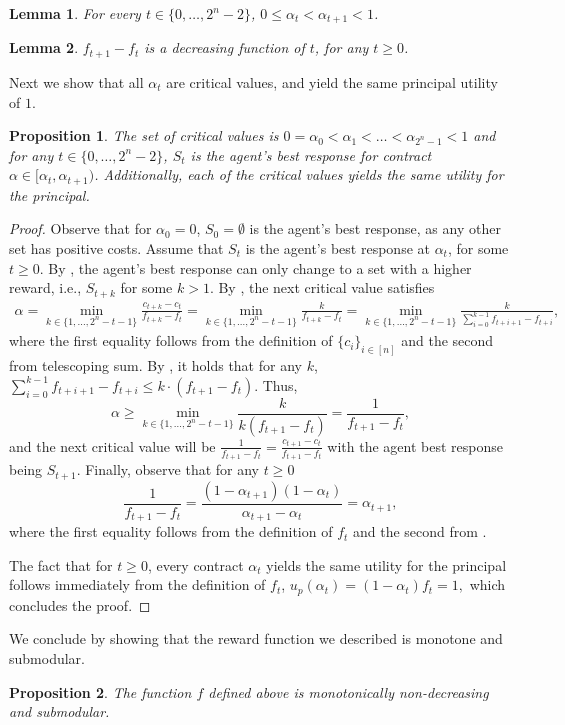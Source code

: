 \documentclass[11pt]{article}
\newtheorem{lemma}{Lemma}
\newtheorem{proposition}{Proposition}
\begin{document}
\begin{lemma}\label{lem:alphaMon}
    For every $t \in \{0,\dots,2^n-2\}$, $0 \le \alpha_t < \alpha_{t+1} < 1$.
\end{lemma}

\begin{lemma}\label{lem:fMarginalDecrease}
     $f_{t+1} - f_t$ is a decreasing function of $t$, for any $t \ge 0$.
\end{lemma}

Next we show that all $\alpha_t$ are critical values, and yield the same principal utility of $1$.
\begin{proposition}\label{prop:CVs}
    The set of critical values is $0 = \alpha_0 < \alpha_1 < \ldots < \alpha_{2^n-1} < 1$ and for any $t \in \{0, \ldots, 2^n-2\}$, $S_t$ is the agent's best response for contract $\alpha \in [\alpha_t, \alpha_{t+1})$. Additionally, each of the critical values yields the same utility for the principal.
\end{proposition}
\begin{proof}
    Observe that for $\alpha_0=0$, $S_0=\emptyset$ is the agent's best response, as any other set has positive costs.
    Assume that $S_t$ is the agent's best response at $\alpha_t$, for some $t\ge 0$. By , the agent's best response can only change to a set with a higher reward, i.e., $S_{t+k}$ for some $k>1$. 
    By , the next critical value satisfies
\begin{eqnarray*}
    \alpha =  
    \min_{k \in \{1,\ldots,2^n-t-1\}} \frac{c_{t+k} - c_{t}}{f_{t+k}-f_{t}} 
    =
    \min_{k \in \{1,\ldots,2^n-t-1\}}
    \frac{k}{f_{t+k}-f_{t}}
    =
    \min_{k \in \{1,\ldots,2^n-t-1\}}
    \frac{k}{\sum_{i=0}^{k-1}f_{t+i+1}-f_{t+i}},
\end{eqnarray*}
    where the first equality follows from the definition of $\{c_i\}_{i \in [n]}$ and the second from telescoping sum.
    By , it holds that for any $k$,
    $\sum_{i=0}^{k-1}f_{t+i+1}-f_{t+i} \le k \cdot (f_{t+1}-f_t)$. Thus, 
    $$
    \alpha \ge \min_{k \in \{1,\ldots,2^n-t-1\}}
    \frac{k}{k(f_{t+1}-f_{t})} = \frac{1}{f_{t+1}-f_{t}},
    $$
    and the next critical value will be $\frac{1}{f_{t+1}-f_{t}} = \frac{c_{t+1}-c_t}{f_{t+1}-f_{t}}$ with the agent best response being $S_{t+1}$.
    Finally, observe that for any $t \ge 0$
    $$
    \frac{1}{f_{t+1}-f_t} 
    = \frac{(1-\alpha_{t+1})(1-\alpha_t)}{\alpha_{t+1}-\alpha_t}
    = \alpha_{t+1},
    $$
    where the first equality follows from the definition of $f_t$ and the second from .

    The fact that for $t \ge 0$, every contract $\alpha_t$ yields the same utility for the principal follows immediately from the definition of $f_t$,
    $
    u_p(\alpha_t) = (1-\alpha_t)f_t = 1,
    $
    which concludes the proof.
\end{proof}
We conclude by showing that the reward function we described is monotone and submodular.
\begin{proposition}\label{prop:fSubmodular}
    The function $f$ defined above is monotonically non-decreasing and submodular.
\end{proposition}
\end{document}
